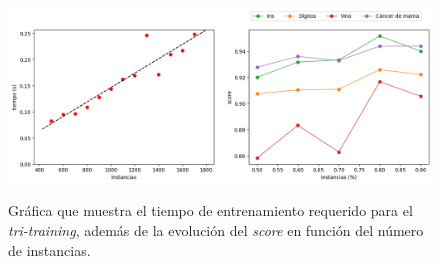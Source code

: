 \begin{figure}[h]
	\caption[\textit{Tri-training}: resultados experimentación (tiempo-porcentaje)]{Gráfica que muestra el tiempo de entrenamiento requerido para el \textit{tri-training}, además de la evolución del \textit{score} en función del número de instancias.}
	\centering
	\includegraphics[scale=0.4]{../img/memoria/5_tritraining_time-percentage}
	\label{gr:tt_time-percentage}
\end{figure}

